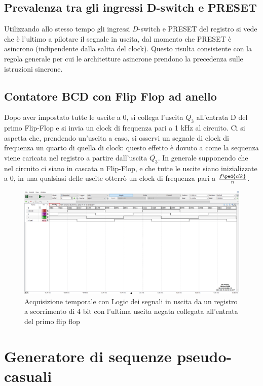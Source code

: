 \documentclass[10pt, a4paper, italian]{article}
\begin{document}
\subsection{Prevalenza tra gli ingressi D-switch e PRESET}
Utilizzando allo stesso tempo gli ingressi $D$-switch e PRESET del registro
si vede che è l'ultimo a pilotare il segnale in uscita, dal momento che PRESET
è asincrono (indipendente dalla salita del clock). Questo risulta consistente
con la regola generale per cui le architetture asincrone prendono la precedenza
sulle istruzioni sincrone. 

\subsection{Contatore BCD con Flip Flop ad anello}
Dopo aver impostato tutte le uscite a 0, si collega l'uscita $\overline{Q_3}$ all'entrata D del primo Flip-Flop e si  invia un clock di frequenza pari a 1 kHz al circuito.
Ci si aspetta che, prendendo un'uscita a caso, si osservi un segnale di clock di frequenza un quarto di quella di clock: questo effetto è dovuto a come la sequenza viene caricata nel registro a partire dall'uscita $\overline{Q_3}$.
In generale supponendo che nel circuito ci siano in cascata n Flip-Flop, e che tutte le uscite siano inizializzate a 0, in una qualsiasi delle uscite otterrò un clock di frequenza pari a $\frac{f\ped{clk}}{n}$.
\begin{figure}[htbp]
\centering
	\includegraphics[width=\textwidth]{3.e}
	\caption{Acquisizione temporale con Logic dei segnali in uscita da un registro a scorrimento di 4 bit con l'ultima uscita negata collegata all'entrata del primo flip flop
	\label{fig: Shift_reg_seq}}
\end{figure}

\section{Generatore di sequenze pseudo-casuali}
\end{document}
